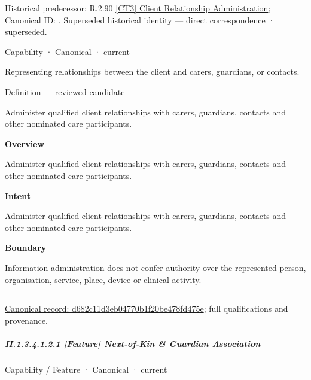 {\small Historical predecessor: R.2.90 \hyperref[element:2c799ec0c4c74c97a75c12e949887b95]{[CT3] Client Relationship Administration}; Canonical ID: \texttt{}. Superseded historical identity — direct correspondence · superseded.}\par
\label{element:d682c11d3eb04770b1f20be478fd475e}
{\small Capability · Canonical · current}\par

Representing relationships between the client and carers, guardians, or contacts.



Definition — reviewed candidate



Administer qualified client relationships with carers, guardians, contacts and other nominated care participants.



\textbf{Overview}



Administer qualified client relationships with carers, guardians, contacts and other nominated care participants.



\textbf{Intent}



Administer qualified client relationships with carers, guardians, contacts and other nominated care participants.



\textbf{Boundary}



Information administration does not confer authority over the represented person, organisation, service, place, device or clinical activity.



\medskip\hrule\medskip

{\footnotesize \href{../../../../../../../continuum/strategy/capability/d682c11d3eb04770b1f20be478fd475e.md}{Canonical record: d682c11d3eb04770b1f20be478fd475e}; full qualifications and provenance.}\par
\subparagraph*{II.1.3.4.1.2.1 [Feature] Next-of-Kin \& Guardian Association}
\label{navigation:II.1.3.4.1.2.1}

\label{element:05de74a8a7dc4334ba60543a228e73cb}
{\small Capability / Feature · Canonical · current}\par


